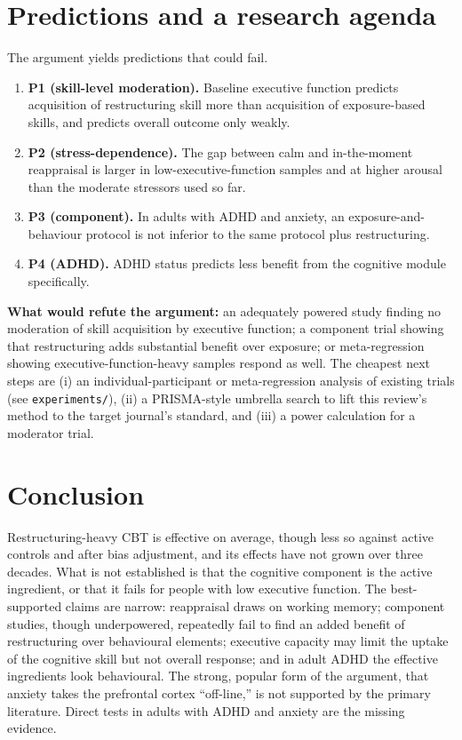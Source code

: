 \section{Predictions and a research agenda}\label{sec:agenda}
The argument yields predictions that could fail.
\begin{enumerate}
\item \textbf{P1 (skill-level moderation).} Baseline executive function predicts acquisition of restructuring skill more than acquisition of exposure-based skills, and predicts overall outcome only weakly.
\item \textbf{P2 (stress-dependence).} The gap between calm and in-the-moment reappraisal is larger in low-executive-function samples and at higher arousal than the moderate stressors used so far.
\item \textbf{P3 (component).} In adults with ADHD and anxiety, an exposure-and-behaviour protocol is not inferior to the same protocol plus restructuring.
\item \textbf{P4 (ADHD).} ADHD status predicts less benefit from the cognitive module specifically.
\end{enumerate}
\textbf{What would refute the argument:} an adequately powered study finding no moderation of skill acquisition by executive function; a component trial showing that restructuring adds substantial benefit over exposure; or meta-regression showing executive-function-heavy samples respond as well. The cheapest next steps are (i) an individual-participant or meta-regression analysis of existing trials (see \texttt{experiments/}), (ii) a PRISMA-style umbrella search to lift this review's method to the target journal's standard, and (iii) a power calculation for a moderator trial.

\section{Conclusion}
Restructuring-heavy CBT is effective on average, though less so against active controls and after bias adjustment, and its effects have not grown over three decades. What is not established is that the cognitive component is the active ingredient, or that it fails for people with low executive function. The best-supported claims are narrow: reappraisal draws on working memory; component studies, though underpowered, repeatedly fail to find an added benefit of restructuring over behavioural elements; executive capacity may limit the uptake of the cognitive skill but not overall response; and in adult ADHD the effective ingredients look behavioural. The strong, popular form of the argument, that anxiety takes the prefrontal cortex ``off-line,'' is not supported by the primary literature. Direct tests in adults with ADHD and anxiety are the missing evidence.
